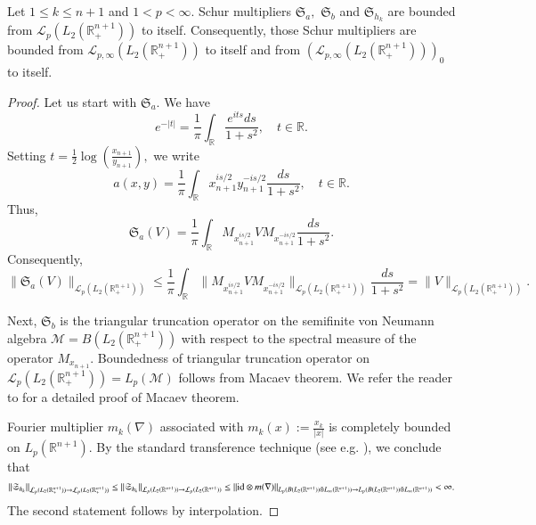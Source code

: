 \documentclass{amsart}
\begin{document}
\begin{lemma}\label{standard schur lemma}
Let $1\leq k\leq n+1$ and $1<p<\infty.$ Schur multipliers $\mathfrak{S}_a,$ $\mathfrak{S}_b$ and $\mathfrak{S}_{h_k}$ are bounded from $\mathcal{L}_p(L_2(\mathbb{R}^{n+1}_+))$ to itself. Consequently, those Schur multipliers are bounded from $\mathcal{L}_{p,\infty}(L_2(\mathbb{R}^{n+1}_+))$ to itself and from $(\mathcal{L}_{p,\infty}(L_2(\mathbb{R}^{n+1}_+)))_0$ to itself.
\end{lemma}
\begin{proof} Let us start with $\mathfrak{S}_a.$ We have
$$e^{-|t|}=\frac1{\pi}\int_{\mathbb{R}}\frac{e^{its}ds}{1+s^2},\quad t\in\mathbb{R}.$$
Setting $t=\frac{1}{2}\log(\frac{x_{n+1}}{y_{n+1}}),$ we write
$$a(x,y)=\frac1{\pi}\int_{\mathbb{R}}x_{n+1}^{is/2}y_{n+1}^{-is/2}\frac{ds}{1+s^2},\quad t\in\mathbb{R}.$$
Thus,
$$\mathfrak{S}_a(V)=\frac1{\pi}\int_{\mathbb{R}}M_{x_{n+1}^{is/2}}VM_{x_{n+1}^{-is/2}}\frac{ds}{1+s^2}.$$
Consequently,
$$\|\mathfrak{S}_a(V)\|_{\mathcal{L}_p(L_2(\mathbb{R}^{n+1}_+))}\leq\frac1{\pi}\int_{\mathbb{R}}\|M_{x_{n+1}^{is/2}}VM_{x_{n+1}^{-is/2}}\|_{\mathcal{L}_p(L_2(\mathbb{R}^{n+1}_+))}\frac{ds}{1+s^2}=\|V\|_{\mathcal{L}_p(L_2(\mathbb{R}^{n+1}_+))}.$$

Next, $\mathfrak{S}_b$ is the triangular truncation operator on the semifinite von Neumann algebra $\mathcal{M}=B(L_2(\mathbb{R}^{n+1}_+))$ with respect to the spectral measure of the operator $M_{x_{n+1}}.$ Boundedness of triangular truncation operator on
$\mathcal{L}_p(L_2(\mathbb{R}^{n+1}_+))=L_p(\mathcal{M})$ follows from Macaev theorem. We refer the reader to \cite{MSZ-krein} for a detailed proof of Macaev theorem.

Fourier multiplier $m_k(\nabla)$ associated with $m_k(x):=\frac{x_{k}}{|x|}$ is completely bounded on $L_p(\mathbb{R}^{n+1}).$ By the standard transference technique (see e.g.  \cite{MR3378821,MR2866074}), we conclude that
$$\|\mathfrak{S}_{h_k}\|_{\mathcal{L}_p(L_2(\mathbb{R}_+^{n+1}))\rightarrow \mathcal{L}_p(L_2(\mathbb{R}_+^{n+1}))}\leq \|\mathfrak{S}_{h_k}\|_{\mathcal{L}_p(L_2(\mathbb{R}^{n+1}))\rightarrow \mathcal{L}_p(L_2(\mathbb{R}^{n+1}))}\leq\|{\rm id}\otimes m(\nabla)\|_{L_p(B(L_2(\mathbb{R}^{n+1}))\bar{\otimes}L_{\infty}(\mathbb{R}^{n+1}))\rightarrow L_p(B(L_2(\mathbb{R}^{n+1}))\bar{\otimes}L_{\infty}(\mathbb{R}^{n+1}))}<\infty.$$
The second statement follows by interpolation.
\end{proof}
\end{document}

